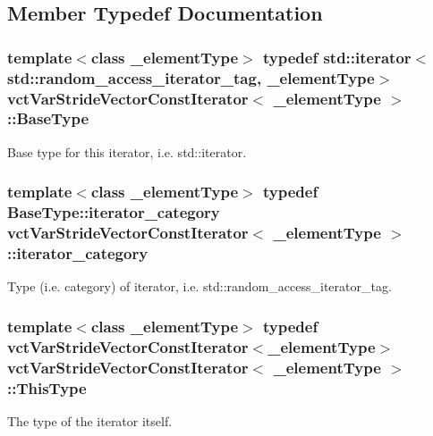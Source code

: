 \subsection{Member Typedef Documentation}
\hypertarget{classvct_var_stride_vector_const_iterator_aff6a833a060e9e88031f459ab4380d1e}{
\subsubsection[{Base\-Type}]{\setlength{\rightskip}{0pt plus 5cm}template$<$class \-\_\-element\-Type$>$ typedef std\-::iterator$<$std\-::random\-\_\-access\-\_\-iterator\-\_\-tag, \-\_\-element\-Type$>$ {\bf vct\-Var\-Stride\-Vector\-Const\-Iterator}$<$ \-\_\-element\-Type $>$\-::{\bf Base\-Type}}}\label{classvct_var_stride_vector_const_iterator_aff6a833a060e9e88031f459ab4380d1e}
Base type for this iterator, i.\-e. std\-::iterator. \hypertarget{classvct_var_stride_vector_const_iterator_ab2fdb1f3617d3ac621e096e4a447694a}{
\subsubsection[{iterator\-\_\-category}]{\setlength{\rightskip}{0pt plus 5cm}template$<$class \-\_\-element\-Type$>$ typedef Base\-Type\-::iterator\-\_\-category {\bf vct\-Var\-Stride\-Vector\-Const\-Iterator}$<$ \-\_\-element\-Type $>$\-::{\bf iterator\-\_\-category}}}\label{classvct_var_stride_vector_const_iterator_ab2fdb1f3617d3ac621e096e4a447694a}
Type (i.\-e. category) of iterator, i.\-e. std\-::random\-\_\-access\-\_\-iterator\-\_\-tag. \hypertarget{classvct_var_stride_vector_const_iterator_afd99aad7dc756d227f4fb02cd569d00a}{
\subsubsection[{This\-Type}]{\setlength{\rightskip}{0pt plus 5cm}template$<$class \-\_\-element\-Type$>$ typedef {\bf vct\-Var\-Stride\-Vector\-Const\-Iterator}$<$\-\_\-element\-Type$>$ {\bf vct\-Var\-Stride\-Vector\-Const\-Iterator}$<$ \-\_\-element\-Type $>$\-::{\bf This\-Type}}}\label{classvct_var_stride_vector_const_iterator_afd99aad7dc756d227f4fb02cd569d00a}
The type of the iterator itself. 

